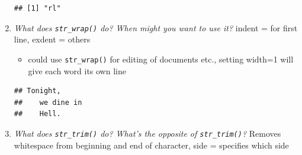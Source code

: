 \documentclass[]{book}
\newenvironment{Shaded}{\begin{snugshade}}{\end{snugshade}}
\newcommand{\DataTypeTok}[1]{\textcolor[rgb]{0.13,0.29,0.53}{#1}}
\newcommand{\DecValTok}[1]{\textcolor[rgb]{0.00,0.00,0.81}{#1}}
\newcommand{\KeywordTok}[1]{\textcolor[rgb]{0.13,0.29,0.53}{\textbf{#1}}}
\newcommand{\NormalTok}[1]{#1}
\newcommand{\OperatorTok}[1]{\textcolor[rgb]{0.81,0.36,0.00}{\textbf{#1}}}
\newcommand{\StringTok}[1]{\textcolor[rgb]{0.31,0.60,0.02}{#1}}
\providecommand{\tightlist}{%
  \setlength{\itemsep}{0pt}\setlength{\parskip}{0pt}}
\theoremstyle{definition}
\theoremstyle{definition}
\theoremstyle{definition}
\theoremstyle{remark}
\begin{document}
\begin{enumerate}
\begin{Shaded}
\end{Shaded}

\begin{verbatim}
## [1] "rl"
\end{verbatim}
\item
  \emph{What does \texttt{str\_wrap()} do? When might you want to use
  it?} indent = for first line, exdent = others

  \begin{itemize}
  \tightlist
  \item
    could use \texttt{str\_wrap()} for editing of documents etc.,
    setting width=1 will give each word its own line
  \end{itemize}

\begin{Shaded}
\end{Shaded}

\begin{verbatim}
## Tonight,
##    we dine in
##    Hell.
\end{verbatim}
\item
  \emph{What does \texttt{str\_trim()} do? What's the opposite of
  \texttt{str\_trim()}?} Removes whitespace from beginning and end of
  character, side = specifies which side


\end{enumerate}
\end{document}
